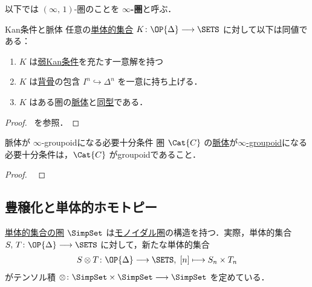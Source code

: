 \documentclass[TQFT_main]{subfiles}
\begin{document}
\begin{marker}
    以下では $(\infty,\, 1)$-圏のことを $\bm{\infty}$\textbf{-圏}と呼ぶ．
\end{marker}

\begin{mytheo}[label=thm:KanCplx]{Kan条件と脈体}
    任意の\hyperref[def:SimpSet]{単体的集合} $K \colon \OP{\Delta} \lto \SETS$ に対して以下は同値である：
    \begin{enumerate}
        \item $K$ は\hyperref[def:KanCplx]{弱Kan条件}を充たす一意解を持つ
        \item $K$ は\hyperref[def:horn]{背骨}の包含 $I^n \hookrightarrow \Delta^n$ を一意に持ち上げる．
        \item $K$ はある圏の\hyperref[def:nerve]{脈体}と\hyperref[def:iso]{同型}である．
    \end{enumerate}
\end{mytheo}

\begin{proof}
    ~\cite[p.20, Theorem 1.1.52]{Land2021infinity}を参照．
\end{proof}

\begin{myprop}[label=prop:nerve]{脈体が $\infty$-groupoidになる必要十分条件}
    圏 $\Cat{C}$ の\hyperref[def:nerve]{脈体}が\hyperref[def:infinity-1]{$\infty$-groupoid}になる必要十分条件は，$\Cat{C}$ がgroupoidであること．
\end{myprop}

\begin{proof}
    ~\cite[p.23, Lemma 1.1.54]{Land2021infinity}
\end{proof}

\subsection{豊穣化と単体的ホモトピー}

\hyperref[def:SimpSet]{単体的集合の圏} $\SimpSet$ は\hyperref[def:monoidal-category]{モノイダル圏}の構造を持つ．実際，単体的集合 $S,\, T \colon \OP{\Delta} \lto \SETS$ に対して，新たな単体的集合
\begin{align}
    S \otimes T \colon \OP{\Delta} \lto \SETS,\; [n] \lmto S_n \times T_n
\end{align}
がテンソル積 $\otimes \colon \SimpSet \times \SimpSet \lto \SimpSet$ を定めている．
\end{document}
